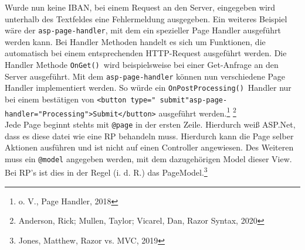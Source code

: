 \documentclass[a4paper,
12pt,
oneside]
{article}
\begin{document}
	Wurde nun keine IBAN, bei einem Request an den Server, eingegeben wird unterhalb des Textfeldes eine Fehlermeldung ausgegeben. Ein weiteres Beispiel wäre der \texttt{asp-page-handler}, mit dem ein spezieller Page Handler ausgeführt werden kann. Bei Handler Methoden handelt es sich um Funktionen, die automatisch bei einem entsprechenden HTTP-Request ausgeführt werden. Die Handler Methode \texttt{OnGet()}~wird beispielsweise bei einer Get-Anfrage an den Server ausgeführt. Mit dem \texttt{asp-page-handler} können nun verschiedene Page Handler implementiert werden. So würde ein  \texttt{OnPostProcessing()}~Handler nur bei einem bestätigen von \texttt{<button type="{} submit"{}asp-page-handler="{}Processing"{}>Submit</button>} ausgeführt werden.\footnote{o. V., Page Handler, 2018} \footnote{Anderson, Rick; Mullen, Taylor; Vicarel, Dan, Razor Syntax, 2020} \\
	Jede Page beginnt stehts mit \texttt{@page} in der ersten Zeile. Hierdurch weiß ASP.Net, dass es diese datei wie eine RP behandeln muss. Hierdurch kann die Page selber Aktionen ausführen und ist nicht auf einen Controller angewiesen. Des Weiteren muss ein \texttt{@model} angegeben werden, mit dem dazugehörigen Model dieser View. Bei RP's ist dies in der Regel (i. d. R.) das PageModel.\footnote{Jones, Matthew, Razor vs. MVC, 2019}
	
	
	
\end{document}
